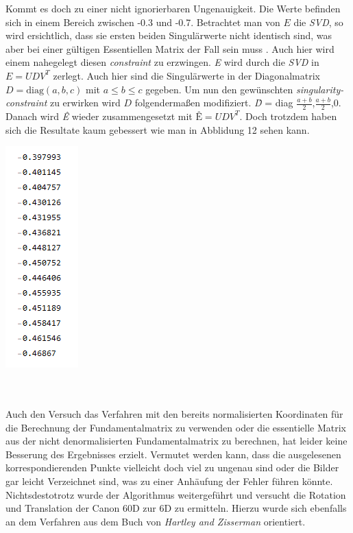 Kommt es doch zu einer nicht ignorierbaren Ungenauigkeit. Die Werte befinden sich in einem Bereich zwischen -0.3 und -0.7. Betrachtet man von \ensuremath{E} die \textit{SVD}, so wird ersichtlich, dass sie ersten beiden Singulärwerte nicht identisch sind, was aber bei einer gültigen Essentiellen Matrix der Fall sein muss \cite{HZ}. Auch hier wird einem nahegelegt diesen \textit{constraint} zu erzwingen. \textit{E} wird durch die \textit{SVD} in \ensuremath{E = UDV^T} zerlegt. Auch hier sind die Singulärwerte in der Diagonalmatrix \ensuremath{D = \text{diag}(a,b,c)} mit \ensuremath{a\leq b \leq c} gegeben. Um nun den gewünschten \textit{singularity-constraint} zu erwirken wird \ensuremath{D} folgendermaßen modifiziert. \textit{\^D} = diag \ensuremath{\frac{a+b}{2}},\ensuremath{\frac{a+b}{2}},0. Danach wird \textit{\^E} wieder zusammengesetzt mit \ensuremath{\textit{\^E}= UDV^T}. Doch trotzdem haben sich die Resultate kaum gebessert wie man in  Abblidung 12 sehen kann.\\

\begin{minipage}{\linewidth}
	\centering
	\includegraphics[width=.15\linewidth]{images/resultE.png}
\end{minipage}\\\\

Auch den Versuch das Verfahren mit den bereits normalisierten Koordinaten für die Berechnung der Fundamentalmatrix zu verwenden oder die essentielle Matrix aus der nicht denormalisierten Fundamentalmatrix zu berechnen, hat leider keine Besserung des Ergebnisses erzielt. Vermutet werden kann, dass die ausgelesenen korrespondierenden Punkte vielleicht doch viel zu ungenau sind oder die Bilder gar leicht Verzeichnet sind, was zu einer Anhäufung der Fehler führen könnte. Nichtsdestotrotz wurde der Algorithmus weitergeführt und versucht die Rotation und Translation der Canon 60D zur 6D zu ermitteln. Hierzu wurde sich ebenfalls an dem Verfahren aus dem Buch von \textit{Hartley and Zisserman} orientiert.\\

